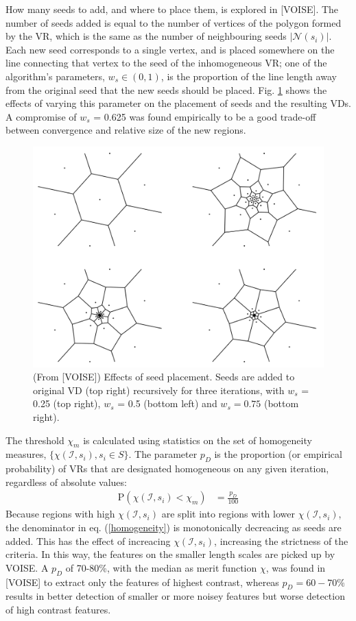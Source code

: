 \documentclass[12pt, report, a4paper, titlepage]{article}
\numberwithin{equation}{section}
\newcommand*{\citen}{}%
\DeclareRobustCommand*{\citen}[1]{%
  \begingroup
    \romannumeral-`\x %
    \setcitestyle{numbers}%
    \cite{#1}%
  \endgroup
}
\begin{document}
How many seeds to add, and where to place them, is explored in [\citen{VOISE}]. The number of seeds added is equal to the number of vertices of the polygon formed by the VR, which is the same as the number of neighbouring seeds $|\mathcal{N}(s_i)|$. Each new seed corresponds to a single vertex, and is placed somewhere on the line connecting that vertex to the seed of the inhomogeneous VR; one of the algorithm's parameters, $w_s \in (0, 1)$, is the proportion of the line length away from the original seed that the new seeds should be placed. Fig. \ref{seed-placement} shows the effects of varying this parameter on the placement of seeds and the resulting VDs. A compromise of $w_s$ = 0.625 was found empirically to be a good trade-off between convergence and relative size of the new regions.

\begin{figure}[h!]
	\center
 	\includegraphics[width=.9\linewidth]{seed_placement.png}
    \caption{(From [\citen{VOISE}]) Effects of seed placement. Seeds are added to original VD (top right) recursively for three iterations, with $w_s$ = 0.25 (top right), $w_s$ = 0.5 (bottom left) and $w_s = 0.75$ (bottom right).}
    \label{seed-placement}
\end{figure}

The threshold $\chi_m$ is calculated using statistics on the set of homogeneity measures, $\{\chi(\mathcal{I}, s_i), s_i \in S\}$. The parameter $p_D$ is the proportion (or empirical probability) of VRs that are designated homogeneous on any given iteration, regardless of absolute values:
\begin{align}
	\text{P}\left(\chi(\mathcal{I}, s_i) < \chi_m\right) &= \frac{p_D}{100}
\end{align}
Because regions with high $\chi(\mathcal{I}, s_i)$ are split into regions with lower $\chi(\mathcal{I}, s_i)$, the denominator in eq. (\ref{homogeneity}) is monotonically decreacing as seeds are added. This has the effect of increacing $\chi(\mathcal{I}, s_i)$, increasing the strictness of the criteria. In this way, the features on the smaller length scales are picked up by VOISE. A $p_D$ of 70-80\%, with the median as merit function $\chi$, was found in [\citen{VOISE}] to extract only the features of highest contrast, whereas $p_D = 60-70\%$ results in better detection of smaller or more noisey features but worse detection of high contrast features.
\end{document}
